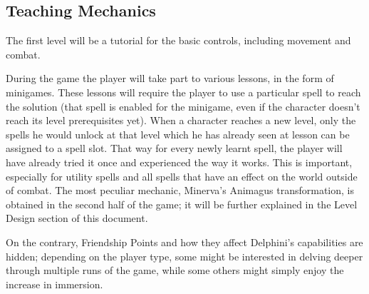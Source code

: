 \pagebreak

\subsection{Teaching Mechanics}

The first level will be a tutorial for the basic controls, including movement and combat.

During the game the player will take part to various lessons, in the form of minigames. These lessons will require the player to use a particular spell to reach the solution (that spell is enabled for the minigame, even if the character doesn't reach its level prerequisites yet).
When a character reaches a new level, only the spells he would unlock at that level which he has already seen at lesson can be assigned to a spell slot. That way for every newly learnt spell, the player will have already tried it once and experienced the way it works.
This is important, especially for utility spells and all spells that have an effect on the world outside of combat.
The most peculiar mechanic, Minerva's Animagus transformation, is obtained in the second half of the game; it will be further explained in the Level Design section of this document.

On the contrary, Friendship Points and how they affect Delphini's capabilities are hidden; depending on the player type, some might be interested in delving deeper through multiple runs of the game, while some others might simply enjoy the increase in immersion.

\pagebreak